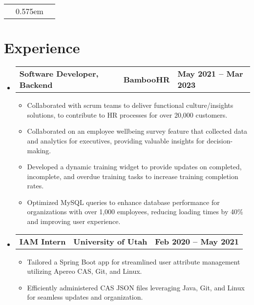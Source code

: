 \documentclass[letterpaper,11pt]{article}
\makeatletter
\def\namespaceskip{0.575em}
\def\afterheaderspace{1.1pt}
\newcommand\printaddress{
  \small{\@address}
}
\newcommand\printname{
  \typeout {kokoko}
  \typeout \spaceskip
  \spaceskip \namespaceskip \relax
  \textbf{\LARGE\textls[150]{\textsc{\@name}}}
}
\newcommand\printcontacts{
  \small{\@contacts}
}
\newcommand\makeheader{
  \begin{center}
    \begin{tabu} to 1\textwidth { X[l,m] X[2,c,m] X[r,m] }
      \printaddress & \printname & \printcontacts \\
    \end{tabu}
  \end{center}
  \vspace*{\afterheaderspace}
}
\makeatother
\begin{document}
\makeheader


\section{\textbf{Experience}}
\begin{itemize}[leftmargin=0.05in, label={}]
	\item{
	            \begin{tabu} {X[l] X[c] X[r]}
		            \textbf{Software Developer, Backend} & \textbf{BambooHR} & \textbf{May 2021 -- Mar 2023} \\
	            \end{tabu}
	            \begin{itemize}[label=$\bullet$]
		            \item{Collaborated with scrum teams to deliver functional culture/insights solutions, to contribute to HR processes for over 20,000 customers.}
		            \item{Collaborated on an employee wellbeing survey feature that collected data and analytics for executives, providing valuable insights for decision-making.}
		            \item{Developed a dynamic training widget to provide updates on completed, incomplete, and overdue training tasks to increase training completion rates.}
		            \item{Optimized MySQL queries to enhance database performance for organizations with over 1,000 employees, reducing loading times by 40\% and improving user experience.}
	            \end{itemize}
	      }

	\item{
	            \begin{tabu} to \dimexpr\textwidth-0.15in {X[l] X[c] X[r]}
		            \textbf{IAM Intern} & \textbf{University of Utah} & \textbf{Feb 2020 -- May 2021} \\
	            \end{tabu}

	            \begin{itemize}[label=$\bullet$]
		            \item{Tailored a Spring Boot app for streamlined user attribute management utilizing Apereo CAS, Git, and Linux.}
		            \item{ Efficiently administered CAS JSON files leveraging Java, Git, and Linux for seamless updates and organization.}
	            \end{itemize}
	      }


\end{itemize}
\end{document}
